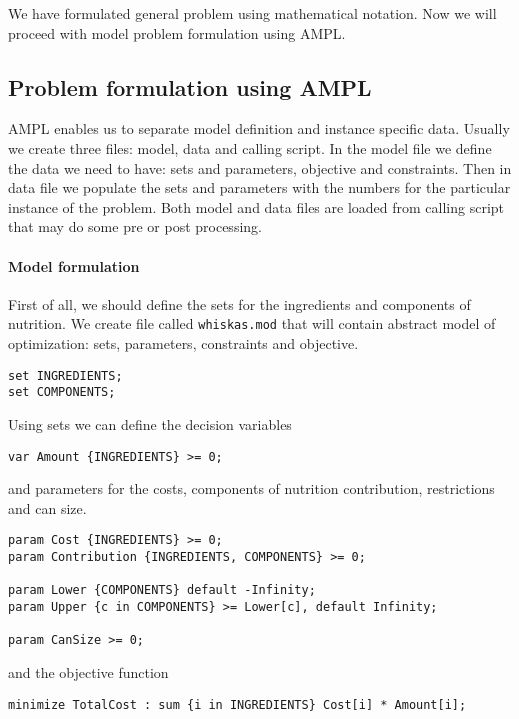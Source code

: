 We have formulated general problem using mathematical notation. Now we will proceed with model problem formulation using AMPL.

\subsection{Problem formulation using AMPL}

AMPL enables us to separate model definition and instance specific data. Usually we create three files: model, data and calling script. In the model file we define the data we need to have: sets and parameters, objective and constraints. Then in data file we populate the sets and parameters with the numbers for the particular instance of the problem. Both model and data files are loaded from calling script that may do some pre or post processing.

\paragraph{Model formulation}

First of all, we should define the sets for the ingredients and components of nutrition. We create file called \texttt{whiskas.mod} that will contain abstract model of optimization: sets, parameters, constraints and objective.

\begin{lstlisting}
set INGREDIENTS;
set COMPONENTS;
\end{lstlisting}

Using sets we can define the decision variables
\begin{lstlisting}
var Amount {INGREDIENTS} >= 0;
\end{lstlisting}

and parameters for the costs, components of nutrition contribution, restrictions and can size.

\begin{lstlisting}
param Cost {INGREDIENTS} >= 0;
param Contribution {INGREDIENTS, COMPONENTS} >= 0;

param Lower {COMPONENTS} default -Infinity;
param Upper {c in COMPONENTS} >= Lower[c], default Infinity;

param CanSize >= 0;

\end{lstlisting}

and the objective function

\begin{lstlisting}
minimize TotalCost : sum {i in INGREDIENTS} Cost[i] * Amount[i];
\end{lstlisting}

